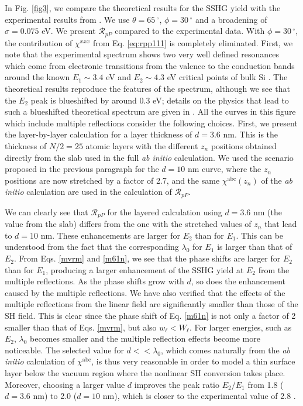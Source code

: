 \documentclass[utf8]{frontiersSCNS}
\begin{document}
In Fig. \ref{fig3}, we compare the theoretical results for the SSHG yield with
the experimental results from \cite{mejiaPRB02}. We use $\theta=65\,^{\circ}$,
$\phi = 30\,^{\circ}$ and a broadening of $\sigma = 0.075$ eV. We present
$\mathcal{R}_{pP}$ compared to the experimental data. With $\phi =
30\,^{\circ}$, the contribution of $\chi^{xxx}$ from Eq. \eqref{eq:rpp111} is
completely eliminated. First, we note that the experimental spectrum shows two
very well defined resonances which come from electronic transitions from the
valence to the conduction bands around the known $E_{1}\sim 3.4$ eV and
$E_{2}\sim 4.3$ eV critical points of bulk Si \citep{yubook}. The theoretical
results reproduce the features of the spectrum, although we see that the $E_{2}$
peak is blueshifted by around 0.3 eV; details on the physics that lead to such a
blueshifted theoretical spectrum are given in \cite{andersonPRB16a}. All the
curves in this figure which include multiple reflections consider the following
choices. First, we present the layer-by-layer calculation for a layer thickness
of $d=3.6$ nm. This is the thickness of $N/2=25$ atomic layers with the
different $z_{n}$ positions obtained directly from the slab used in the full
\emph{ab initio} calculation. We used the scenario proposed in the previous
paragraph for the $d=10$ nm curve, where the $z_{n}$ positions are now stretched
by a factor of 2.7, and the same $\chi^{\mathrm{abc}}(z_{n})$ of the \emph{ab
initio} calculation are used in the calculation of $\mathcal{R}_{pP}$.

We can clearly see that $\mathcal{R}_{pP}$ for the layered calculation using
$d=3.6$ nm (the value from the slab) differs from the one with the stretched
values of $z_{n}$ that lead to $d=10$ nm. These enhancements are larger for
$E_{2}$ than for $E_{1}$. This can be understood from the fact that the
corresponding $\lambda_{0}$ for $E_{1}$ is larger than that of $E_{2}$. From
Eqs. \eqref{mvrm} and \eqref{m61n}, we see that the phase shifts are larger for
$E_{2}$ than for $E_{1}$, producing a larger enhancement of the SSHG yield at
$E_{2}$ from the multiple reflections. As the phase shifts grow with $d$, so
does the enhancement caused by the multiple reflections. We have also verified
that the effects of the multiple reflections from the linear field are
significantly smaller than those of the SH field. This is clear since the phase
shift of Eq. \eqref{m61n} is not only a factor of 2 smaller than that of Eqs.
\eqref{mvrm}, but also $w_{\ell} < W_{\ell}$. For larger energies, such as
$E_{2}$, $\lambda_{0}$ becomes smaller and the multiple reflection effects
become more noticeable. The selected value for $d << \lambda_{0}$, which comes
naturally from the \emph{ab initio} calculation of $\chi^{\mathrm{abc}}$, is
thus very reasonable in order to model a thin surface layer below the vacuum
region where the nonlinear SH conversion takes place. Moreover, choosing a
larger value $d$ improves the peak ratio $E_{2}/E_{1}$ from 1.8 ($d=3.6$ nm) to
2.0 ($d=10$ nm), which is closer to the experimental value of 2.8
\citep{andersonPRB16b}.
\end{document}

